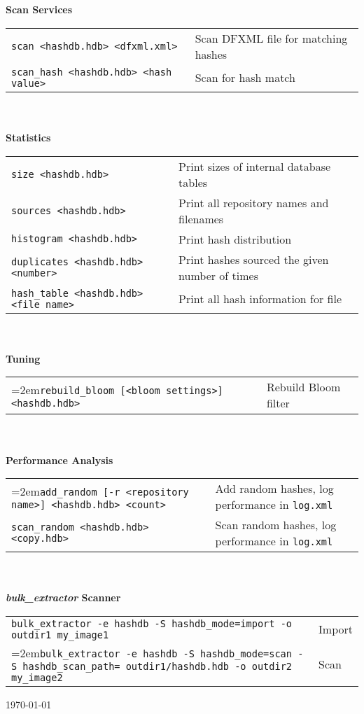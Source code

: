 \documentclass[12pt]{article}
\newcommand{\bulk}{\emph{bulk\_extractor}\xspace}
\begin{document}
\\
\\
\textbf{Scan Services} \\
\begin{tabular}{p{3.6 in} p{4 in}}
\small\texttt{scan <hashdb.hdb> <dfxml.xml>} & Scan DFXML file for matching hashes \\
\small\texttt{scan\_hash <hashdb.hdb> <hash value>} & Scan for hash match \\
\end{tabular}
\\
\\
\textbf{Statistics}\\
\begin{tabular}{p{3.6 in} p{4 in}}
\small\small\texttt{size <hashdb.hdb>} & Print sizes of internal database tables \\
\small\texttt{sources <hashdb.hdb>} & Print all repository names and filenames \\
\small\texttt{histogram <hashdb.hdb>} & Print hash distribution \\
\small\texttt{duplicates <hashdb.hdb> <number>} & Print hashes sourced the given number of times \\
\small\texttt{hash\_table <hashdb.hdb> <file name>} & Print all hash information for file\\
\end{tabular}
\\
\\
\textbf{Tuning}\\
\begin{tabular}{p{3.6 in} p{4 in}}
\hangindent=2em\small\texttt{rebuild\_bloom [<bloom settings>] <hashdb.hdb>} & Rebuild Bloom filter \\
\end{tabular}
\\
\\
\textbf{Performance Analysis}\\
\begin{tabular}{p{3.6 in} p{4 in}}
\hangindent=2em\small\texttt{add\_random [-r <repository name>] <hashdb.hdb> <count>} & Add random hashes, log performance in \texttt{log.xml}\\
\small\texttt{scan\_random <hashdb.hdb> <copy.hdb>} & Scan random hashes, log performance in \texttt{log.xml}\\
\end{tabular}
\\
\\
\textbf{\bulk Scanner}\\
\begin{tabular}{p{6.0 in} l}
\small\texttt{bulk\_extractor -e hashdb -S hashdb\_mode=import -o outdir1 my\_image1} & Import \\
\hangindent=2em\small\texttt{bulk\_extractor -e hashdb -S hashdb\_mode=scan -S hashdb\_scan\_path= outdir1/hashdb.hdb -o outdir2 my\_image2} & Scan \\
\end{tabular}

\vspace{2mm}
\begin{center}
\begin{footnotesize}
\today
\end{footnotesize}
\end{center}
\end{document}
